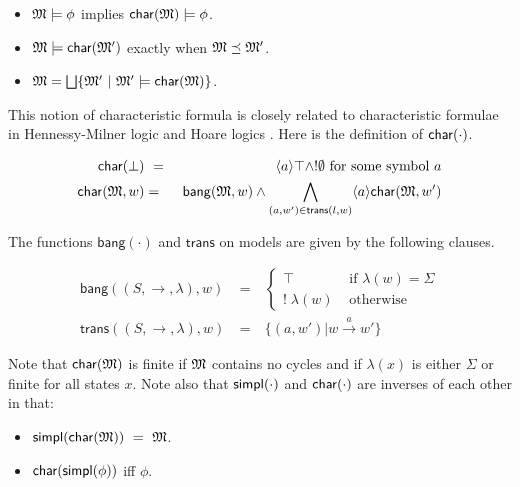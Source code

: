 \begin{itemize}

\item  $\frak{M} \models \phi$ implies $\mathsf{char}(\frak{M}) \models \phi$.

\item  $\frak{M} \models \mathsf{char}( \frak{M}' )$ exactly when $\frak{M} \preceq \frak{M}'$.

\item $\frak{M} = \bigsqcup \{\frak{M}' \ |\ \frak{M}' \models \mathsf{char}(\frak{M}) \}$.

\end{itemize}


\NI This notion of characteristic formula is closely related to
characteristic formulae in Hennessy-Milner logic
\cite{AcetoL:chaforfata} and Hoare logics
\cite{HondaK:descriptive,ChargueraudA:provertcf}. Here is the
definition of $\mathsf{char}(\cdot)$.

\begin{eqnarray*}
  \mathsf{char}(\bot) &\ =\ & \langle a \rangle \top \land ! \emptyset  \mbox{ for some symbol }a  \\
  \mathsf{char}(\frak{M}, w) & = & \mathsf{bang}(\frak{M},w) \land \bigwedge_{(a,w') \in \mathsf{trans}(l,w)} \langle a \rangle \mathsf{char}(\frak{M}, w')  
\end{eqnarray*}


\NI The functions $\mathsf{bang}(\cdot)$ and $\mathsf{trans}$ on
models are given by the following clauses.

\begin{eqnarray*}
  \mathsf{bang}((S,\rightarrow,\lambda),w) 
     & \ = \ & 
  \begin{cases}
    \top & \mbox{ if } \lambda(w) = \Sigma  \\
    ! \; \lambda(w) & \mbox{ otherwise }  
  \end{cases} \\
  \mathsf{trans}((S,\rightarrow, \lambda),w) & \ = \ & \{(a,w') | w \xrightarrow{a} w' \} 
\end{eqnarray*}

\NI Note that $\mathsf{char}(\frak{M})$ is finite if $\frak{M}$ contains no cycles and if
$\lambda(x)$ is either $\Sigma$ or finite for all states $x$.
Note also that $\mathsf{simpl}(\cdot)$ and $\mathsf{char}(\cdot)$ are inverses of each other in that:

\begin{itemize}

\item $\mathsf{simpl}(\mathsf{char}(\frak{M})) \ = \  \frak{M}$. 

\item $\mathsf{char}(\mathsf{simpl}(\phi))$ iff $\phi$.

\end{itemize}

